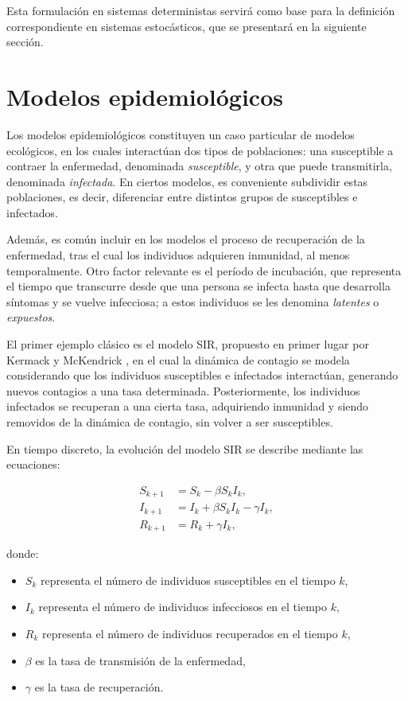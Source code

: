 Esta formulación en sistemas deterministas servirá como base para la definición correspondiente en sistemas estocásticos, que se presentará en la siguiente sección.

\section{Modelos epidemiológicos}

Los modelos epidemiológicos constituyen un caso particular de modelos ecológicos, en los cuales interactúan dos tipos de poblaciones: una susceptible a contraer la enfermedad, denominada \textit{susceptible}, y otra que puede transmitirla, denominada \textit{infectada}. En ciertos modelos, es conveniente subdividir estas poblaciones, es decir, diferenciar entre distintos grupos de susceptibles e infectados.

Además, es común incluir en los modelos el proceso de recuperación de la enfermedad, tras el cual los individuos adquieren inmunidad, al menos temporalmente. Otro factor relevante es el período de incubación, que representa el tiempo que transcurre desde que una persona se infecta hasta que desarrolla síntomas y se vuelve infecciosa; a estos individuos se les denomina \textit{latentes} o \textit{expuestos}.

El primer ejemplo clásico es el modelo SIR, propuesto en primer lugar por Kermack y McKendrick \cite{Kermack1991ContributionsEpidemicsI, Kermack1991ContributionsEndemicity, Kermack1991ContributionsFurtherStudies}, en el cual la dinámica de contagio se modela considerando que los individuos susceptibles e infectados interactúan, generando nuevos contagios a una tasa determinada. Posteriormente, los individuos infectados se recuperan a una cierta tasa, adquiriendo inmunidad y siendo removidos de la dinámica de contagio, sin volver a ser susceptibles.

En tiempo discreto, la evolución del modelo SIR se describe mediante las ecuaciones:

\begin{equation}
    \begin{aligned}
    S_{k+1} &= S_k -\beta S_k I_k, \\
    I_{k+1} &= I_k + \beta S_k I_k - \gamma I_k, \\
    R_{k+1} &= R_k + \gamma I_k,
    \end{aligned}
    \label{eq:SIR}
\end{equation}

donde:
\begin{itemize}
    \item \(S_k\) representa el número de individuos susceptibles en el tiempo \(k\),
    \item \(I_k\) representa el número de individuos infecciosos en el tiempo \(k\),
    \item \(R_k\) representa el número de individuos recuperados en el tiempo \(k\),
    \item \(\beta\) es la tasa de transmisión de la enfermedad,
    \item \(\gamma\) es la tasa de recuperación.
\end{itemize}

